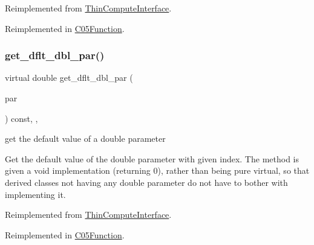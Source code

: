 Reimplemented from \mbox{\hyperlink{class_s_m_spp__di__unipi__it_1_1_thin_compute_interface_a82f363814aa27e3243ba994a1ed5f39e}{Thin\+Compute\+Interface}}.



Reimplemented in \mbox{\hyperlink{class_s_m_spp__di__unipi__it_1_1_c05_function_a6d353ac3d1200d9bea89235da61bc4f3}{C05\+Function}}.

\mbox{\label{class_s_m_spp__di__unipi__it_1_1_function_a465a771c115acf8d5f4e32e22f003014}} 
\subsubsection{\texorpdfstring{get\+\_\+dflt\+\_\+dbl\+\_\+par()}{get\_dflt\_dbl\_par()}}
{\footnotesize\ttfamily virtual double get\+\_\+dflt\+\_\+dbl\+\_\+par (\begin{DoxyParamCaption}\item[{const \mbox{\hyperlink{class_s_m_spp__di__unipi__it_1_1_thin_compute_interface_aa3d710629ad8c434286726ad810c3b47}{idx\+\_\+type}}}]{par }\end{DoxyParamCaption}) const\hspace{0.3cm}{\ttfamily [inline]}, {\ttfamily [override]}, {\ttfamily [virtual]}}



get the default value of a double parameter 

Get the default value of the double parameter with given index. The method is given a void implementation (returning 0), rather than being pure virtual, so that derived classes not having any double parameter do not have to bother with implementing it. 

Reimplemented from \mbox{\hyperlink{class_s_m_spp__di__unipi__it_1_1_thin_compute_interface_ae2d249f431892cbf41ccf19204b78228}{Thin\+Compute\+Interface}}.



Reimplemented in \mbox{\hyperlink{class_s_m_spp__di__unipi__it_1_1_c05_function_a465a771c115acf8d5f4e32e22f003014}{C05\+Function}}.

\mbox{\label{class_s_m_spp__di__unipi__it_1_1_function_a75dd1491b74c4b9476755e061dce3e04}} 
